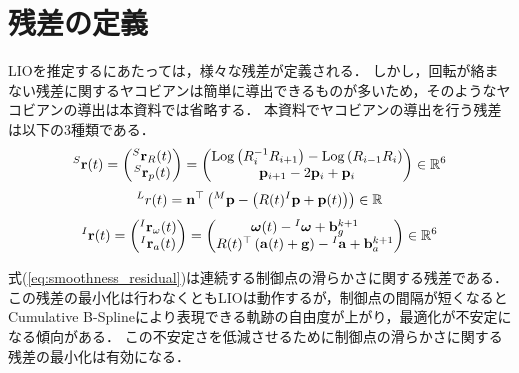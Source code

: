 \section{残差の定義}

LIOを推定するにあたっては，様々な残差が定義される．
しかし，回転が絡まない残差に関するヤコビアンは簡単に導出できるものが多いため，そのようなヤコビアンの導出は本資料では省略する．
本資料でヤコビアンの導出を行う残差は以下の3種類である．
%
\begin{align}
  {}^{S}{\bf r}(t)
  =
  \left( \begin{matrix}
    {}^{S}{\bf r}_{R}(t) \\
    {}^{S}{\bf r}_{p}(t)
  \end{matrix} \right)
  =
  \left( \begin{matrix}
    {\rm Log} \left( R_{i}^{-1} R_{i+1} \right) - {\rm Log} \left( R_{i-1} R_{i} \right) \\
    {\bf p}_{i+1} - 2 {\bf p}_{i} + {\bf p}_{i} \\
  \end{matrix} \right) \in \mathbb{R}^{6}
  \label{eq:smoothness_residual}
\end{align}
%
\begin{align}
  {}^{L}r(t) = {\bf n}^{\top} \left( {}^{M}{\bf p} - \left( R(t) {}^{I}{\bf p} + {\bf p}(t) \right) \right) \in \mathbb{R}
  \label{eq:scan_matching_residual}
\end{align}
%
\begin{align}
  {}^{I}{\bf r}(t)
  =
  \left( \begin{matrix}
    {}^{I}{\bf r}_{\omega}(t) \\
    {}^{I}{\bf r}_{a}(t)
  \end{matrix} \right)
  =
  \left( \begin{matrix}
    \boldsymbol \omega(t) - {}^{I}\boldsymbol \omega + {\bf b}_{g}^{k+1} \\
    R(t)^{\top} \left( {\bf a}(t) + {\bf g} \right) - {}^{I}{\bf a} + {\bf b}_{a}^{k+1}
  \end{matrix} \right) \in \mathbb{R}^{6}
  \label{eq:imu_residual}
\end{align}
%

式(\ref{eq:smoothness_residual})は連続する制御点の滑らかさに関する残差である．
この残差の最小化は行わなくともLIOは動作するが，制御点の間隔が短くなるとCumulative B-Splineにより表現できる軌跡の自由度が上がり，最適化が不安定になる傾向がある．
この不安定さを低減させるために制御点の滑らかさに関する残差の最小化は有効になる．

